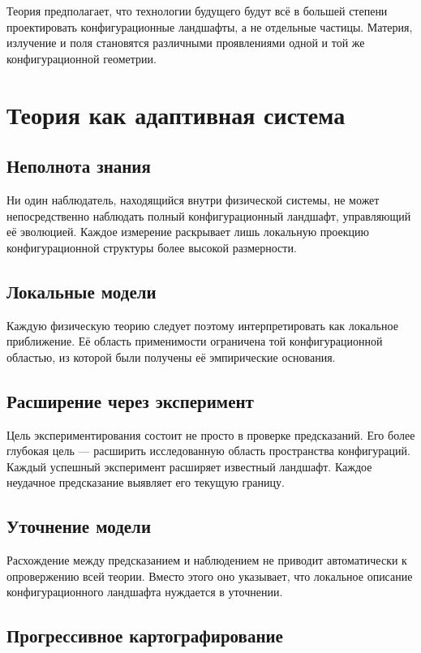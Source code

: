 Теория предполагает, что технологии будущего будут всё в большей степени проектировать конфигурационные ландшафты, а не отдельные частицы. Материя, излучение и поля становятся различными проявлениями одной и той же конфигурационной геометрии.

\chapter{Теория как адаптивная система}

\section{Неполнота знания}

Ни один наблюдатель, находящийся внутри физической системы, не может непосредственно наблюдать полный конфигурационный ландшафт, управляющий её эволюцией. Каждое измерение раскрывает лишь локальную проекцию конфигурационной структуры более высокой размерности.

\section{Локальные модели}

Каждую физическую теорию следует поэтому интерпретировать как локальное приближение. Её область применимости ограничена той конфигурационной областью, из которой были получены её эмпирические основания.

\section{Расширение через эксперимент}

Цель экспериментирования состоит не просто в проверке предсказаний. Его более глубокая цель — расширить исследованную область пространства конфигураций. Каждый успешный эксперимент расширяет известный ландшафт. Каждое неудачное предсказание выявляет его текущую границу.

\section{Уточнение модели}

Расхождение между предсказанием и наблюдением не приводит автоматически к опровержению всей теории. Вместо этого оно указывает, что локальное описание конфигурационного ландшафта нуждается в уточнении.

\section{Прогрессивное картографирование}

